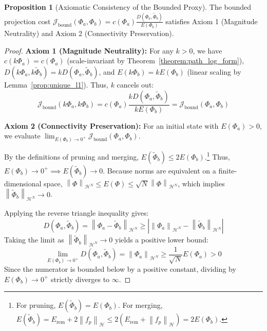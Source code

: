 \documentclass[11pt, a4paper, copyright, gdm]{google}
\newcommand{\norm}[1]{\left\lVert#1\right\rVert}
\newcommand{\abs}[1]{\left\lvert#1\right\rvert}
\newcommand{\calH}{\mathcal{H}}
\newcommand{\calJ}{\mathcal{J}}
\theoremstyle{definition}
\newtheorem{proposition}[theorem]{Proposition}
\begin{document}
\begin{proposition}[Axiomatic Consistency of the Bounded Proxy]
\label{prop:bound_axioms}
The bounded projection cost $\calJ_{\text{bound}}(\Phi_a, \Phi_b) = c(\Phi_a) \frac{D(\Phi_a, \tilde{\Phi}_b)}{E(\Phi_b)}$ satisfies Axiom 1 (Magnitude Neutrality) and Axiom 2 (Connectivity Preservation).
\end{proposition}

\begin{proof}
\noindent\textbf{Axiom 1 (Magnitude Neutrality):} For any $k > 0$, we have $c(k\Phi_a) = c(\Phi_a)$ (scale-invariant by Theorem~\ref{theorem:path_log_form}), $D(k\Phi_a, k\tilde{\Phi}_b) = k D(\Phi_a, \tilde{\Phi}_b)$, and $E(k\Phi_b) = k E(\Phi_b)$ (linear scaling by Lemma~\ref{prop:unique_l1}). Thus, $k$ cancels out:
\begin{equation*}
    \calJ_{\text{bound}}(k\Phi_a, k\Phi_b) = c(\Phi_a) \frac{k D(\Phi_a, \tilde{\Phi}_b)}{k E(\Phi_b)} = \calJ_{\text{bound}}(\Phi_a, \Phi_b)
\end{equation*}

\noindent\textbf{Axiom 2 (Connectivity Preservation):} For an initial state with $E(\Phi_a) > 0$, we evaluate $\lim_{E(\Phi_b) \rightarrow 0^+} \calJ_{\text{bound}}(\Phi_a, \Phi_b)$. 

By the definitions of pruning and merging, $E(\tilde{\Phi}_b) \le 2E(\Phi_b)$.\footnote{For pruning, $E(\tilde{\Phi}_b) = E(\Phi_b)$. For merging, $E(\tilde{\Phi}_b) = E_{\text{rem}} + 2\norm{f_p}_\calH \le 2(E_{\text{rem}} + \norm{f_p}_\calH) = 2E(\Phi_b)$.} Thus, $E(\Phi_b) \rightarrow 0^+ \implies E(\tilde{\Phi}_b) \rightarrow 0$. Because norms are equivalent on a finite-dimensional space, $\norm{\Phi}_{\calH^N} \le E(\Phi) \le \sqrt{N} \norm{\Phi}_{\calH^N}$, which implies $\norm{\tilde{\Phi}_b}_{\calH^N} \rightarrow 0$.

Applying the reverse triangle inequality gives:
\begin{equation*}
    D(\Phi_a, \tilde{\Phi}_b) = \norm{\Phi_a - \tilde{\Phi}_b}_{\calH^N} \ge \abs{\norm{\Phi_a}_{\calH^N} - \norm{\tilde{\Phi}_b}_{\calH^N}}
\end{equation*}
Taking the limit as $\norm{\tilde{\Phi}_b}_{\calH^N} \rightarrow 0$ yields a positive lower bound:
\begin{equation*}
    \lim_{E(\Phi_b) \rightarrow 0^+} D(\Phi_a, \tilde{\Phi}_b) = \norm{\Phi_a}_{\calH^N} \ge \frac{1}{\sqrt{N}} E(\Phi_a) > 0
\end{equation*}
Since the numerator is bounded below by a positive constant, dividing by $E(\Phi_b) \to 0^+$ strictly diverges to $\infty$.
\end{proof}
\end{document}
